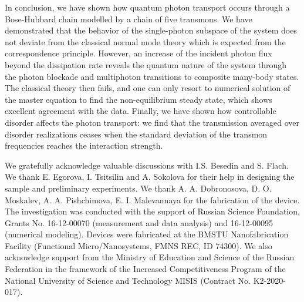 \documentclass[%
 aps, prl,
 amsmath,amssymb,
 reprint,%
superscriptaddress
]{revtex4-2}
\begin{document}
In conclusion, we have shown how quantum photon transport occurs through a Bose-Hubbard chain modelled by a chain of five transmons. We have demonstrated that the behavior of the single-photon subspace of the system does not deviate from the classical normal mode theory which is expected from the correspondence principle. However, an increase of the incident photon flux beyond the dissipation rate reveals the quantum nature of the system through the photon blockade and multiphoton transitions to composite many-body states. The classical theory then fails, and one can only resort to numerical solution of the master equation to find the non-equilibrium steady state, which shows excellent agreement with the data. Finally, we have shown how controllable disorder affects the photon transport: we find that the transmission averaged over disorder realizations ceases when the standard deviation of the transmon frequencies reaches the interaction strength.

We gratefully acknowledge valuable discussions with I.S. Besedin and S. Flach. We thank E. Egorova, I. Tsitsilin and A. Sokolova for their help in designing the sample and preliminary experiments. We thank  A. A. Dobronosova, D. O. Moskalev, A. A. Pishchimova, E. I. Malevannaya for the fabrication of the device. The investigation was conducted with the support of Russian Science Foundation, Grants No. 16-12-00070 (measurement and data analysis) and 16-12-00095 (numerical modeling). Devices were fabricated at the BMSTU Nanofabrication Facility (Functional Micro/Nanosystems, FMNS REC, ID 74300). We also acknowledge support from the Ministry of Education and Science of the Russian Federation in the framework of the Increased Competitiveness Program of the National University of Science and Technology MISIS (Contract No. K2-2020-017). 


\end{document}
